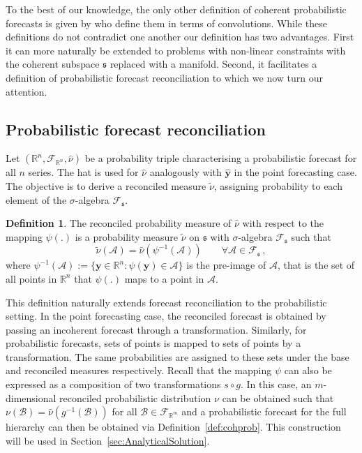 \documentclass[12pt]{article}
\theoremstyle{definition}
\newtheorem{definition}{Definition}[section]
\begin{document}
To the best of our knowledge, the only other definition of coherent probabilistic forecasts is given by \cite{Taieb2017} who define them in terms of convolutions. While these definitions do not contradict one another our definition has two advantages.  First it can more naturally be extended to problems with non-linear constraints with the coherent subspace $\mathfrak{s}$ replaced with a manifold.  Second, it facilitates a definition of probabilistic forecast reconciliation to which we now turn our attention.

\subsection{Probabilistic forecast reconciliation}

Let $(\mathbb{R}^n, \mathscr{F}_{\mathbb{R}^n}, \hat{\nu})$ be a probability triple characterising a probabilistic forecast for all $n$ series. The hat is used for $\hat{\nu}$ analogously with $\hat{\bm y}$ in the point forecasting case.  The objective is to derive a reconciled measure $\tilde{\nu}$, assigning probability to each element of the $\sigma$-algebra $\mathscr{F}_\mathfrak{s}$.

\begin{definition} \label{def:reconprob}
	The reconciled probability measure of $\hat{\nu}$ with respect to the mapping $\psi(.)$ is a probability measure $\tilde{\nu}$ on $\mathfrak{s}$ with $\sigma$-algebra $\mathscr{F}_\mathfrak{s}$ such that
	\[
	\tilde{\nu}(\mathcal{A}) =  \hat{\nu}(\psi^{-1}(\mathcal{A})) \qquad \forall \mathcal{A} \in \mathscr{F}_{\mathfrak{s}}\,,
	\]
	where $\psi^{-1}(\mathcal{A}):=\{{\bm{y}}\in \mathbb{R}^n:\psi({\bm{y}})\in \mathcal{A}\}$ is the pre-image of $\mathcal{A}$, that is the set of all points in $\mathbb{R}^n$ that $\psi(.)$ maps to a point in $\mathcal{A}$.
\end{definition}

This definition naturally extends forecast reconciliation to the probabilistic setting. In the point forecasting case, the reconciled forecast is obtained by passing an incoherent forecast through a transformation. Similarly, for probabilistic forecasts, sets of points is mapped to sets of points by a transformation. The same probabilities are assigned to these sets under the base and reconciled measures respectively.  Recall that the mapping $\psi$ can also be expressed as a composition of two transformations $s\circ g$. In this case, an $m$-dimensional reconciled probabilistic distribution $\nu$ can be obtained such that $\nu(\mathcal{B})= \hat{\nu}(g^{-1}(\mathcal{B}))$ for all $\mathcal{B} \in \mathscr{F}_{\mathbb{R}^m}$ and a probabilistic forecast for the full hierarchy can then be obtained via Definition~\ref{def:cohprob}.  This construction will be used in Section~\ref{sec:AnalyticalSolution}.
\end{document}
